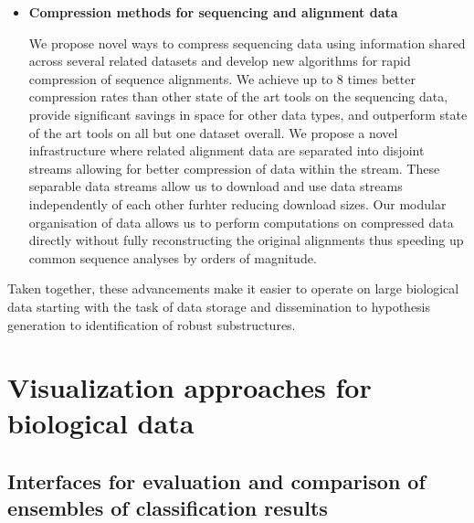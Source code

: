 \documentclass[12pt]{cmuthesis}
\begin{document}
\begin{itemize}
  \item \textbf{Compression methods for sequencing and alignment data}

  We propose novel ways to compress sequencing data using information shared across several related datasets and develop new algorithms for rapid compression of sequence alignments. We achieve up to 8 times better compression rates than other state of the art tools on the sequencing data, provide significant savings in space for other data types, and outperform state of the art tools on all but one dataset overall. We propose a novel infrastructure where related alignment data are separated into disjoint streams allowing for better compression of data within the stream. These separable data streams allow us to download and use data streams independently of each other furhter reducing download sizes. Our modular organisation of data allows us to perform computations on compressed data directly without fully reconstructing the original alignments thus speeding up common sequence analyses by orders of magnitude.

\end{itemize}

Taken together, these advancements make it easier to operate on large biological data starting with the task of data storage and dissemination to hypothesis generation to identification of robust substructures.

\part{Visualization approaches for biological data}
\label{part:vis}



\chapter{Interfaces for evaluation and comparison of ensembles of classification results}
\label{chapter:coral}
\end{document}
